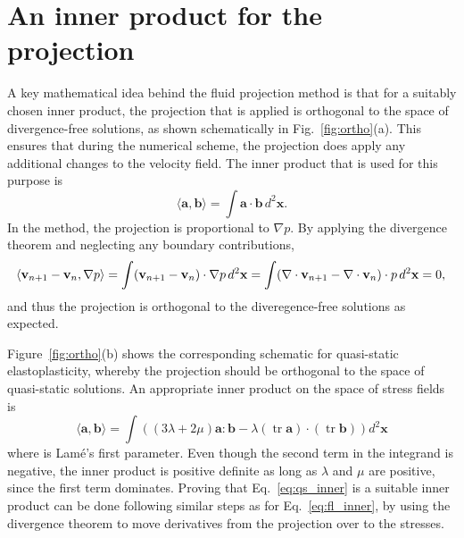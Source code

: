 \documentclass[11pt]{article}
\renewcommand{\vec}[1]{\mathbf{#1}}
\DeclareMathOperator{\tr}{tr}
\begin{document}
\section*{An inner product for the projection}
A key mathematical idea behind the fluid projection method is that for a
suitably chosen inner product, the projection that is applied is orthogonal to
the space of divergence-free solutions, as shown schematically in
Fig.~\ref{fig:ortho}(a). This ensures that during the numerical scheme, the
projection does apply any additional changes to the velocity field. The inner
product that is used for this purpose is
\begin{equation}
  \langle \vec{a},\vec{b} \rangle = \int \vec{a} \cdot \vec{b} \, d^2 \vec{x}. \label{eq:fl_inner}
\end{equation}
In the method, the projection is proportional to $\nabla p$. By applying the
divergence theorem and neglecting any boundary contributions,
\begin{equation}
  \langle \vec{v}_{n+1} - \vec{v}_n, \nabla p \rangle =  \int (\vec{v}_{n+1} - \vec{v}_n) \cdot \nabla p \, d^2\vec{x}
  = \int ( \nabla \cdot \vec{v}_{n+1} - \nabla \cdot \vec{v}_{n} ) \cdot p \, d^2 \vec{x} = 0,\\
\end{equation}
and thus the projection is orthogonal to the diveregence-free solutions as
expected.

Figure~\ref{fig:ortho}(b) shows the corresponding schematic for quasi-static
elastoplasticity, whereby the projection should be orthogonal to the space of
quasi-static solutions. An appropriate inner product on the space of stress
fields is
\begin{equation}
  \langle \vec{a},\vec{b} \rangle = \int \left((3\lambda + 2 \mu) \vec{a} : \vec{b} - \lambda(\tr \vec{a}) \cdot (\tr \vec{b}) \right) d^2\vec{x}
  \label{eq:qs_inner}
\end{equation}
where  is Lam\'e's first parameter. Even
though the second term in the integrand is negative, the inner product is
positive definite as long as $\lambda$ and $\mu$ are positive, since the first
term dominates. Proving that Eq.~\ref{eq:qs_inner} is a suitable inner product
can be done following similar steps as for Eq.~\ref{eq:fl_inner}, by using
the divergence theorem to move derivatives from the projection over to the
stresses.
\end{document}
